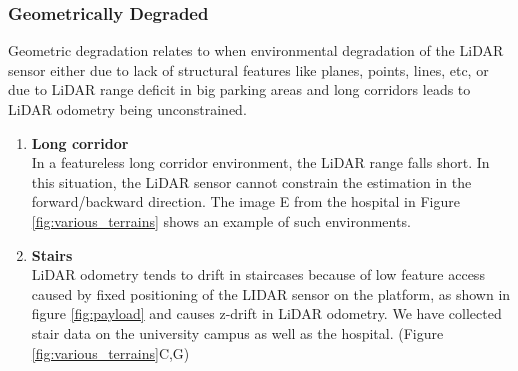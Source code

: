 \documentclass[10pt,twocolumn,letterpaper]{article}
\begin{document}
\subsubsection{ Geometrically Degraded}
Geometric degradation relates to when environmental degradation of the LiDAR sensor either due to lack of structural features like planes, points, lines, etc, or due to LiDAR range deficit in big parking areas and long corridors leads to LiDAR odometry being unconstrained.



\begin{enumerate}[label=(\alph*)]
    \item \textbf{Long corridor} \\
    In a featureless long corridor environment, the LiDAR range falls short. In this situation, the LiDAR sensor cannot constrain the estimation in the forward/backward direction. The image E from the hospital in Figure \ref{fig:various_terrains} shows an example of such environments.

    \item \textbf{Stairs} \\
    LiDAR odometry tends to drift in staircases because of low feature access caused by fixed positioning of the LIDAR sensor on the platform, as shown in figure \ref{fig:payload} and causes z-drift in LiDAR odometry. We have collected stair data on the university campus as well as the hospital. (Figure \ref{fig:various_terrains}C,G)
\end{enumerate}

\end{document}
